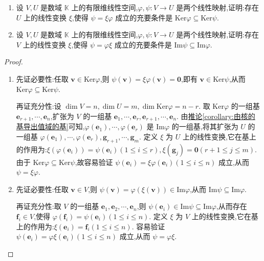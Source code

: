 \documentclass[../../main.tex]{subfiles}%
\begin{document}
\begin{proposition}\label{proposition:核空间和值域与线性映射}
\begin{enumerate}[(1)]
\item 设 \(V,U\) 是数域 \(\mathbb{K}\) 上的有限维线性空间,\(\varphi,\psi:V\to U\) 是两个线性映射,证明:存在 \(U\) 上的线性变换 \(\xi\),使得 \(\psi = \xi\varphi\) 成立的充要条件是 \(\text{Ker}\varphi\subseteq\text{Ker}\psi\).

\item 设 \(V,U\) 是数域 \(\mathbb{K}\) 上的有限维线性空间,\(\varphi,\psi:V\to U\) 是两个线性映射,证明:存在 \(V\) 上的线性变换 \(\xi\),使得 \(\psi = \varphi\xi\) 成立的充要条件是 \(\text{Im}\psi\subseteq\text{Im}\varphi\).
\end{enumerate}
\end{proposition}
\begin{proof}
\begin{enumerate}[(1)]
\item 先证必要性:任取 \(\boldsymbol{v}\in\text{Ker}\varphi\),则 \(\psi(\boldsymbol{v}) = \xi\varphi(\boldsymbol{v}) = \boldsymbol{0}\),即有 \(\boldsymbol{v}\in\text{Ker}\psi\),从而 \(\text{Ker}\varphi\subseteq\text{Ker}\psi\). 

再证充分性:设 \(\dim V = n,\dim U = m,\dim\text{Ker}\varphi = n - r\). 取 \(\text{Ker}\varphi\) 的一组基 \(\boldsymbol{e}_{r + 1},\cdots,\boldsymbol{e}_n\),扩张为 \(V\) 的一组基 \(\boldsymbol{e}_1,\cdots,\boldsymbol{e}_r,\boldsymbol{e}_{r + 1},\cdots,\boldsymbol{e}_n\). 由\hyperref[corollary:由核的基导出值域的基]{推论\ref{corollary:由核的基导出值域的基}}可知,\(\varphi(\boldsymbol{e}_1),\cdots,\varphi(\boldsymbol{e}_r)\) 是 \(\text{Im}\varphi\) 的一组基,将其扩张为 \(U\) 的一组基 \(\varphi(\boldsymbol{e}_1),\cdots,\varphi(\boldsymbol{e}_r),\boldsymbol{g}_{r + 1},\cdots,\boldsymbol{g}_m\). 定义 \(\xi\) 为 \(U\) 上的线性变换,它在基上的作用为:\(\xi(\varphi(\boldsymbol{e}_i)) = \psi(\boldsymbol{e}_i)(1\leqslant  i\leqslant  r),\xi(\boldsymbol{g}_j) = \boldsymbol{0}(r + 1\leqslant  j\leqslant  m)\). 由于 \(\text{Ker}\varphi\subseteq\text{Ker}\psi\),故容易验证 \(\psi(\boldsymbol{e}_i) = \xi\varphi(\boldsymbol{e}_i)(1\leqslant  i\leqslant  n)\) 成立,从而 \(\psi = \xi\varphi\).

\item 先证必要性:任取 \(\boldsymbol{v}\in V\),则 \(\psi(\boldsymbol{v}) = \varphi(\xi(\boldsymbol{v}))\in\text{Im}\varphi\),从而 \(\text{Im}\psi\subseteq\text{Im}\varphi\). 

再证充分性:取 \(V\) 的一组基 \(\boldsymbol{e}_1,\boldsymbol{e}_2,\cdots,\boldsymbol{e}_n\),则 \(\psi(\boldsymbol{e}_i)\in\text{Im}\psi\subseteq\text{Im}\varphi\),从而存在 \(\boldsymbol{f}_i\in V\),使得 \(\varphi(\boldsymbol{f}_i) = \psi(\boldsymbol{e}_i)(1\leqslant  i\leqslant  n)\). 定义 \(\xi\) 为 \(V\) 上的线性变换,它在基上的作用为:\(\xi(\boldsymbol{e}_i) = \boldsymbol{f}_i(1\leqslant  i\leqslant  n)\). 容易验证 \(\psi(\boldsymbol{e}_i) = \varphi\xi(\boldsymbol{e}_i)(1\leqslant  i\leqslant  n)\) 成立,从而 \(\psi = \varphi\xi\).
\end{enumerate}
\end{proof}
\end{document}
